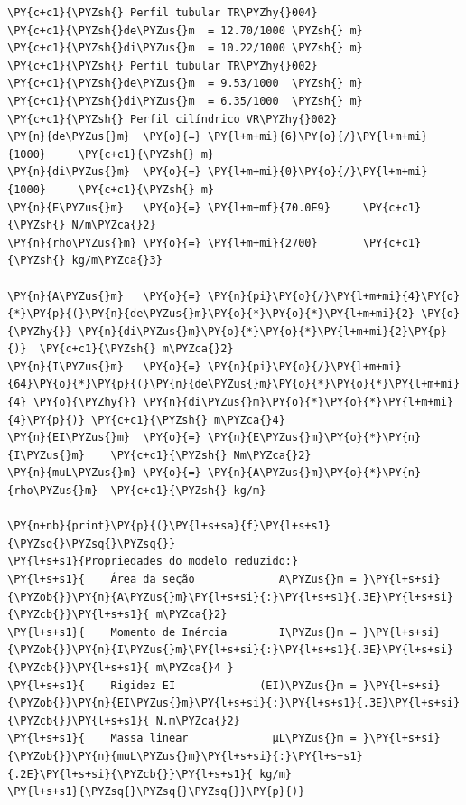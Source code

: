    \begin{tcolorbox}[breakable, size=fbox, boxrule=1pt, pad at break*=1mm,colback=cellbackground, colframe=cellborder]
\begin{Verbatim}[commandchars=\\\{\}]
\PY{c+c1}{\PYZsh{} Perfil tubular TR\PYZhy{}004}
\PY{c+c1}{\PYZsh{}de\PYZus{}m  = 12.70/1000 \PYZsh{} m}
\PY{c+c1}{\PYZsh{}di\PYZus{}m  = 10.22/1000 \PYZsh{} m}
\PY{c+c1}{\PYZsh{} Perfil tubular TR\PYZhy{}002}
\PY{c+c1}{\PYZsh{}de\PYZus{}m  = 9.53/1000  \PYZsh{} m}
\PY{c+c1}{\PYZsh{}di\PYZus{}m  = 6.35/1000  \PYZsh{} m}
\PY{c+c1}{\PYZsh{} Perfil cilíndrico VR\PYZhy{}002}
\PY{n}{de\PYZus{}m}  \PY{o}{=} \PY{l+m+mi}{6}\PY{o}{/}\PY{l+m+mi}{1000}     \PY{c+c1}{\PYZsh{} m}
\PY{n}{di\PYZus{}m}  \PY{o}{=} \PY{l+m+mi}{0}\PY{o}{/}\PY{l+m+mi}{1000}     \PY{c+c1}{\PYZsh{} m}
\PY{n}{E\PYZus{}m}   \PY{o}{=} \PY{l+m+mf}{70.0E9}     \PY{c+c1}{\PYZsh{} N/m\PYZca{}2}
\PY{n}{rho\PYZus{}m} \PY{o}{=} \PY{l+m+mi}{2700}       \PY{c+c1}{\PYZsh{} kg/m\PYZca{}3}

\PY{n}{A\PYZus{}m}   \PY{o}{=} \PY{n}{pi}\PY{o}{/}\PY{l+m+mi}{4}\PY{o}{*}\PY{p}{(}\PY{n}{de\PYZus{}m}\PY{o}{*}\PY{o}{*}\PY{l+m+mi}{2} \PY{o}{\PYZhy{}} \PY{n}{di\PYZus{}m}\PY{o}{*}\PY{o}{*}\PY{l+m+mi}{2}\PY{p}{)}  \PY{c+c1}{\PYZsh{} m\PYZca{}2}
\PY{n}{I\PYZus{}m}   \PY{o}{=} \PY{n}{pi}\PY{o}{/}\PY{l+m+mi}{64}\PY{o}{*}\PY{p}{(}\PY{n}{de\PYZus{}m}\PY{o}{*}\PY{o}{*}\PY{l+m+mi}{4} \PY{o}{\PYZhy{}} \PY{n}{di\PYZus{}m}\PY{o}{*}\PY{o}{*}\PY{l+m+mi}{4}\PY{p}{)} \PY{c+c1}{\PYZsh{} m\PYZca{}4}
\PY{n}{EI\PYZus{}m}  \PY{o}{=} \PY{n}{E\PYZus{}m}\PY{o}{*}\PY{n}{I\PYZus{}m}    \PY{c+c1}{\PYZsh{} Nm\PYZca{}2}
\PY{n}{muL\PYZus{}m} \PY{o}{=} \PY{n}{A\PYZus{}m}\PY{o}{*}\PY{n}{rho\PYZus{}m}  \PY{c+c1}{\PYZsh{} kg/m}

\PY{n+nb}{print}\PY{p}{(}\PY{l+s+sa}{f}\PY{l+s+s1}{\PYZsq{}\PYZsq{}\PYZsq{}}
\PY{l+s+s1}{Propriedades do modelo reduzido:}
\PY{l+s+s1}{    Área da seção             A\PYZus{}m = }\PY{l+s+si}{\PYZob{}}\PY{n}{A\PYZus{}m}\PY{l+s+si}{:}\PY{l+s+s1}{.3E}\PY{l+s+si}{\PYZcb{}}\PY{l+s+s1}{ m\PYZca{}2}
\PY{l+s+s1}{    Momento de Inércia        I\PYZus{}m = }\PY{l+s+si}{\PYZob{}}\PY{n}{I\PYZus{}m}\PY{l+s+si}{:}\PY{l+s+s1}{.3E}\PY{l+s+si}{\PYZcb{}}\PY{l+s+s1}{ m\PYZca{}4 }
\PY{l+s+s1}{    Rigidez EI             (EI)\PYZus{}m = }\PY{l+s+si}{\PYZob{}}\PY{n}{EI\PYZus{}m}\PY{l+s+si}{:}\PY{l+s+s1}{.3E}\PY{l+s+si}{\PYZcb{}}\PY{l+s+s1}{ N.m\PYZca{}2}
\PY{l+s+s1}{    Massa linear             μL\PYZus{}m = }\PY{l+s+si}{\PYZob{}}\PY{n}{muL\PYZus{}m}\PY{l+s+si}{:}\PY{l+s+s1}{.2E}\PY{l+s+si}{\PYZcb{}}\PY{l+s+s1}{ kg/m}
\PY{l+s+s1}{\PYZsq{}\PYZsq{}\PYZsq{}}\PY{p}{)}
\end{Verbatim}
\end{tcolorbox}

